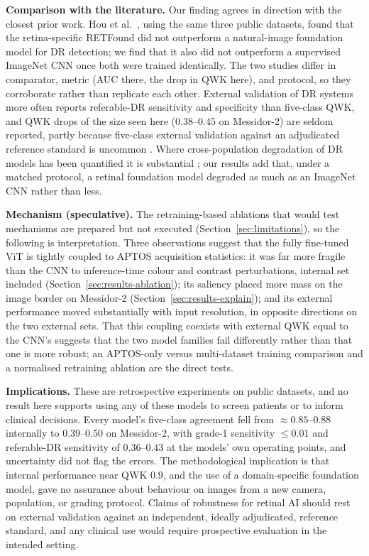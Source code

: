 \documentclass[journal]{IEEEtran}
\renewcommand{\_}{\origunderscore\allowbreak}
\begin{document}
\textbf{Comparison with the literature.} Our finding agrees in direction with
the closest prior work. Hou et al.\ \cite{hou2025dinov2}, using the same three
public datasets, found that the retina-specific RETFound did not outperform a
natural-image foundation model for DR detection; we find that it also did not
outperform a supervised ImageNet CNN once both were trained identically. The two
studies differ in comparator, metric (AUC there, the drop in QWK here), and
protocol, so they corroborate rather than replicate each other. External
validation of DR systems more often reports referable-DR sensitivity and
specificity than five-class QWK, and QWK drops of the size seen here
($0.38$--$0.45$ on Messidor-2) are seldom reported, partly because five-class
external validation against an adjudicated reference standard is uncommon
\cite{grzybowski2020review}. Where cross-population degradation of DR models has
been quantified it is substantial \cite{dai2021spectrum,beede2020}; our results add
that, under a matched protocol, a retinal foundation model degraded as much as an
ImageNet CNN rather than less.

\textbf{Mechanism (speculative).} The retraining-based ablations that would test
mechanisms are prepared but not executed (Section~\ref{sec:limitations}), so the
following is interpretation. Three observations suggest that the fully
fine-tuned ViT is tightly coupled to APTOS acquisition statistics: it was far
more fragile than the CNN to inference-time colour and contrast perturbations,
internal set included (Section~\ref{sec:results-ablation}); its saliency placed
more mass on the image border on Messidor-2 (Section~\ref{sec:results-explain});
and its external performance moved substantially with input resolution, in
opposite directions on the two external sets. That this coupling coexists with
external QWK equal to the CNN's suggests that the two model families fail
differently rather than that one is more robust; an APTOS-only versus
multi-dataset training comparison and a normalised retraining ablation are the
direct tests.

\textbf{Implications.} These are retrospective experiments on public datasets,
and no result here supports using any of these models to screen patients or to
inform clinical decisions. Every model's five-class agreement fell from
$\approx 0.85$--$0.88$ internally to $0.39$--$0.50$ on Messidor-2, with grade-1
sensitivity $\leq 0.01$ and referable-DR sensitivity of $0.36$--$0.43$ at the
models' own operating points, and uncertainty did not flag the errors. The
methodological implication is that internal performance near QWK $0.9$, and the
use of a domain-specific foundation model, gave no assurance about behaviour on
images from a new camera, population, or grading protocol. Claims of robustness
for retinal AI should rest on external validation against an independent,
ideally adjudicated, reference standard, and any clinical use would require
prospective evaluation in the intended setting.
\end{document}

